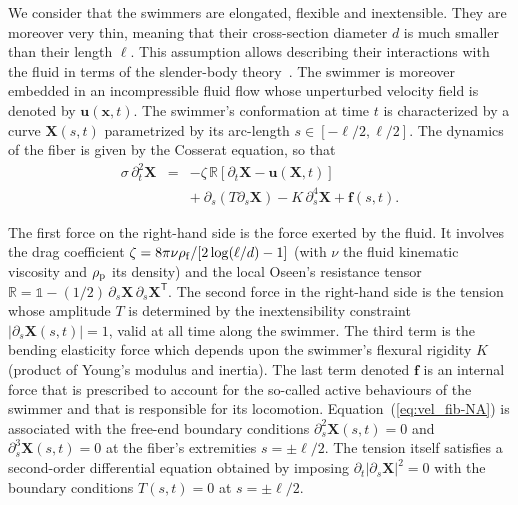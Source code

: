 \documentclass[aps,prl,preprint,groupedaddress]{revtex4-2}
\newcommand{\bX}{\bm X}
\newcommand{\bu}{\bm u}
\newcommand{\bF}{\bm f}
\begin{document}
We consider that the swimmers are elongated, flexible and inextensible. They are moreover very thin, meaning that their cross-section diameter $d$ is much smaller than their length $\ell$. This assumption allows describing their interactions with the fluid in terms of the slender-body theory~\cite{lindner2015elastic}. The swimmer is moreover embedded in an incompressible fluid flow whose unperturbed velocity field is denoted by $\bu(\boldsymbol{x},t)$. The swimmer's conformation at time $t$ is characterized by a curve $\bX(s,t)$ parametrized by its arc-length $s\in[-\ell/2,\ell/2]$. The dynamics of the fiber is given by the Cosserat equation, so that
\begin{eqnarray}
  \sigma\,\partial_t^2\bX  &=& - \zeta\,\mathbb{R}\left[\partial_t \bX-\bu(\bX,t)\right] \nonumber\\
  && +\ \partial_s(T\partial_s \bX) - K\,\partial_s^4 \bX + \bF(s,t).
  \label{eq:vel_fib-NA}
\end{eqnarray}

The first force on the right-hand side is the force exerted by the fluid. It involves the drag coefficient $\zeta = 8\pi\nu\rho_{\rm f}/[2\log(\ell/d)-1]$ (with $\nu$ the fluid kinematic viscosity and $\rho_{\rm p}$ its density) and the local Oseen's resistance tensor $\mathbb{R} = \mathbb{1} -(1/2)\,\partial_s\bX\,\partial_s\bX^{\mathsf{T}}$. The second force in the right-hand side is the tension whose amplitude $T$ is determined by the inextensibility constraint $|\partial_s\bm X(s,t)| = 1$, valid at all time along the swimmer. The third term is the bending elasticity force which depends upon the swimmer's flexural rigidity $K$ (product of Young's modulus and inertia). The last term denoted $\bF$ is an internal force that is prescribed to account for the so-called active behaviours of the swimmer and that is responsible for its locomotion. Equation~(\ref{eq:vel_fib-NA}) is associated with the free-end boundary conditions $\partial_s^2\bX(s,t) = 0$ and $\partial_s^3\bX(s,t) = 0$ at the fiber's extremities $s=\pm\ell/2$. The tension itself satisfies a second-order differential equation obtained by imposing $\partial_t |\partial_s\bX|^2=0$ with the boundary conditions $T(s,t) = 0$ at $s=\pm\ell/2$.
\end{document}
